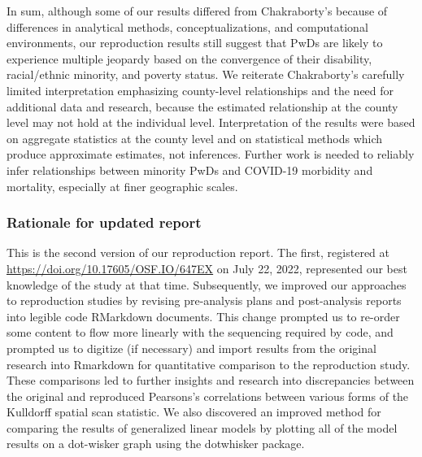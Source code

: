 \documentclass[
]{article}
\begin{document}
In sum, although some of our results differed from Chakraborty's because
of differences in analytical methods, conceptualizations, and
computational environments, our reproduction results still suggest that
PwDs are likely to experience multiple jeopardy based on the convergence
of their disability, racial/ethnic minority, and poverty status. We
reiterate Chakraborty's carefully limited interpretation emphasizing
county-level relationships and the need for additional data and
research, because the estimated relationship at the county level may not
hold at the individual level. Interpretation of the results were based
on aggregate statistics at the county level and on statistical methods
which produce approximate estimates, not inferences. Further work is
needed to reliably infer relationships between minority PwDs and
COVID-19 morbidity and mortality, especially at finer geographic scales.

\hypertarget{rationale-for-updated-report}{%
\subsubsection{Rationale for updated
report}\label{rationale-for-updated-report}}

This is the second version of our reproduction report. The first,
registered at \url{https://doi.org/10.17605/OSF.IO/647EX} on July 22,
2022, represented our best knowledge of the study at that time.
Subsequently, we improved our approaches to reproduction studies by
revising pre-analysis plans and post-analysis reports into legible code
RMarkdown documents. This change prompted us to re-order some content to
flow more linearly with the sequencing required by code, and prompted us
to digitize (if necessary) and import results from the original research
into Rmarkdown for quantitative comparison to the reproduction study.
These comparisons led to further insights and research into
discrepancies between the original and reproduced Pearsons's
correlations between various forms of the Kulldorff spatial scan
statistic. We also discovered an improved method for comparing the
results of generalized linear models by plotting all of the model
results on a dot-wisker graph using the dotwhisker package.
\end{document}
